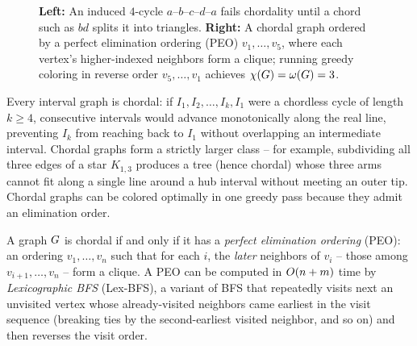 \begin{figure}[htbp]
\caption{\textbf{Left:} An induced $4$-cycle $a$--$b$--$c$--$d$--$a$ fails chordality until a chord such as $bd$ splits it into triangles. \textbf{Right:} A chordal graph ordered by a perfect elimination ordering (PEO) $v_1,\dots,v_5$, where each vertex's higher-indexed neighbors form a clique; running greedy coloring in reverse order $v_5,\dots,v_1$ achieves $\chi(G)=\omega(G)=3$.}
\label{ch28:fig-chordal-peo}
\end{figure}

Every interval graph is chordal: if $I_1,I_2,\dots,I_k,I_1$ were a chordless cycle of length $k\ge 4$, consecutive intervals would advance monotonically along the real line, preventing $I_k$ from reaching back to $I_1$ without overlapping an intermediate interval. Chordal graphs form a strictly larger class -- for example, subdividing all three edges of a star $K_{1,3}$ produces a tree (hence chordal) whose three arms cannot fit along a single line around a hub interval without meeting an outer tip. Chordal graphs can be colored optimally in one greedy pass because they admit an elimination order.

\begin{theorem}
\label{ch28:thm-peo}
A graph $G$ is chordal if and only if it has a \emph{perfect elimination ordering} (PEO): an
ordering $v_1,\dots,v_n$ such that for each $i$, the \emph{later} neighbors of
$v_i$ -- those among $v_{i+1},\dots,v_n$ -- form a clique. A PEO can be computed
in $O(n+m)$ time by \emph{Lexicographic BFS} (Lex-BFS), a variant of BFS that repeatedly visits next an unvisited vertex whose already-visited neighbors came earliest in the visit sequence (breaking ties by the second-earliest visited neighbor, and so on) and then reverses the visit order.
\end{theorem}

